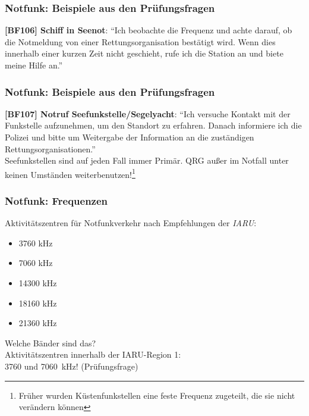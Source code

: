 \begin{frame}
    \frametitle{Notfunk: Beispiele aus den Prüfungsfragen}

    \textbf{[BF106] Schiff in Seenot}: ``Ich beobachte die Frequenz und achte
    darauf, ob die Notmeldung von einer Rettungsorganisation bestätigt wird.
    Wenn dies innerhalb einer kurzen Zeit nicht geschieht, rufe ich die Station
    an und biete meine Hilfe an.'' \\[2em]

\end{frame}

\begin{frame}
    \frametitle{Notfunk: Beispiele aus den Prüfungsfragen}

    \textbf{[BF107] Notruf Seefunkstelle/Segelyacht}: ``Ich versuche Kontakt mit
    der Funkstelle aufzunehmen, um den Standort zu erfahren. Danach informiere
    ich die Polizei und bitte um Weitergabe der Information an die zuständigen
    Rettungsorganisationen.'' \\[2em]

    Seefunkstellen sind auf jeden Fall immer Primär. QRG außer im Notfall unter
    keinen Umständen weiterbenutzen!\footnote{Früher wurden Küstenfunkstellen
    eine feste Frequenz zugeteilt, die sie nicht verändern können}

\end{frame}

\begin{frame}
    \frametitle{Notfunk: Frequenzen}

    Aktivitätszentren für Notfunkverkehr nach Empfehlungen der \emph{IARU}:

    \begin{itemize}
        \item 3760 kHz
        \item 7060 kHz
        \item 14300 kHz
        \item 18160 kHz
        \item 21360 kHz
    \end{itemize}

    Welche Bänder sind das? \\[1em]

    Aktivitätszentren innerhalb der IARU-Region 1:\\
    3760 und 7060~kHz! (Prüfungsfrage)

\end{frame}

